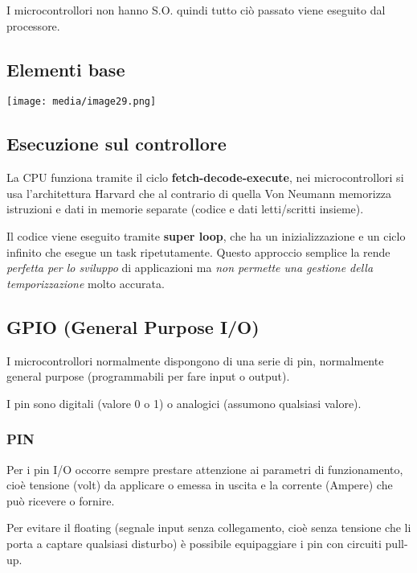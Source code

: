 I microcontrollori non hanno S.O. quindi tutto ciò passato viene
eseguito dal processore.

\subsection{Elementi base}\label{elementi-base}

\texttt{[image: media/image29.png]}

\subsection{Esecuzione sul
controllore}\label{esecuzione-sul-controllore}

La CPU funziona tramite il ciclo \textbf{fetch-decode-execute}, nei
microcontrollori si usa l'architettura Harvard che al contrario di
quella Von Neumann memorizza istruzioni e dati in memorie separate
(codice e dati letti/scritti insieme).

Il codice viene eseguito tramite \textbf{super loop}, che ha un
inizializzazione e un ciclo infinito che esegue un task ripetutamente.
Questo approccio semplice la rende \emph{perfetta per lo sviluppo} di
applicazioni ma \emph{non permette una gestione della temporizzazione}
molto accurata.

\subsection{GPIO (General Purpose I/O)}\label{gpio-general-purpose-io}

I microcontrollori normalmente dispongono di una serie di pin,
normalmente general purpose (programmabili per fare input o output).

I pin sono digitali (valore 0 o 1) o analogici (assumono qualsiasi
valore).

\subsubsection{PIN}\label{pin}

Per i pin I/O occorre sempre prestare attenzione ai parametri di
funzionamento, cioè tensione (volt) da applicare o emessa in uscita e la
corrente (Ampere) che può ricevere o fornire.

Per evitare il floating (segnale input senza collegamento, cioè senza
tensione che li porta a captare qualsiasi disturbo) è possibile
equipaggiare i pin con circuiti pull-up.

